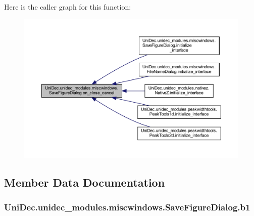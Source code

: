 Here is the caller graph for this function\+:\nopagebreak
\begin{figure}[H]
\begin{center}
\leavevmode
\includegraphics[width=350pt]{class_uni_dec_1_1unidec__modules_1_1miscwindows_1_1_save_figure_dialog_a288b201f014dfe8e9c312a1b082f33d4_icgraph}
\end{center}
\end{figure}




\subsection{Member Data Documentation}
\hypertarget{class_uni_dec_1_1unidec__modules_1_1miscwindows_1_1_save_figure_dialog_aad7424b2c93fbff662e79a275edec7b9}{}
\subsubsection[{b1}]{\setlength{\rightskip}{0pt plus 5cm}Uni\+Dec.\+unidec\+\_\+modules.\+miscwindows.\+Save\+Figure\+Dialog.\+b1}\label{class_uni_dec_1_1unidec__modules_1_1miscwindows_1_1_save_figure_dialog_aad7424b2c93fbff662e79a275edec7b9}
\hypertarget{class_uni_dec_1_1unidec__modules_1_1miscwindows_1_1_save_figure_dialog_a9209881700eb559c083c6319a56cdd54}{}
